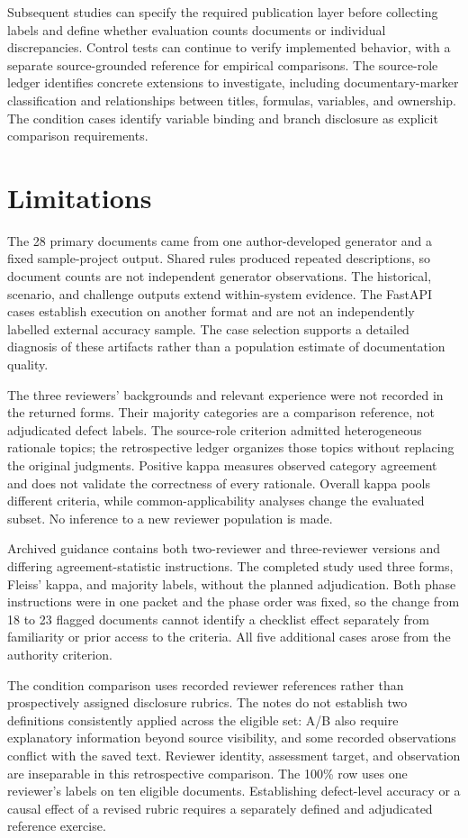 \documentclass[a4paper,fleqn]{cas-dc}
\begin{document}
Subsequent studies can specify the required publication layer before collecting labels and define whether evaluation counts documents or individual discrepancies. Control tests can continue to verify implemented behavior, with a separate source-grounded reference for empirical comparisons. The source-role ledger identifies concrete extensions to investigate, including documentary-marker classification and relationships between titles, formulas, variables, and ownership. The condition cases identify variable binding and branch disclosure as explicit comparison requirements.

\section{Limitations}
\label{sec:limitations}
The 28 primary documents came from one author-developed generator and a fixed sample-project output. Shared rules produced repeated descriptions, so document counts are not independent generator observations. The historical, scenario, and challenge outputs extend within-system evidence. The FastAPI cases establish execution on another format and are not an independently labelled external accuracy sample. The case selection supports a detailed diagnosis of these artifacts rather than a population estimate of documentation quality.

The three reviewers' backgrounds and relevant experience were not recorded in the returned forms. Their majority categories are a comparison reference, not adjudicated defect labels. The source-role criterion admitted heterogeneous rationale topics; the retrospective ledger organizes those topics without replacing the original judgments. Positive kappa measures observed category agreement and does not validate the correctness of every rationale. Overall kappa pools different criteria, while common-applicability analyses change the evaluated subset. No inference to a new reviewer population is made.

Archived guidance contains both two-reviewer and three-reviewer versions and differing agreement-statistic instructions. The completed study used three forms, Fleiss' kappa, and majority labels, without the planned adjudication. Both phase instructions were in one packet and the phase order was fixed, so the change from 18 to 23 flagged documents cannot identify a checklist effect separately from familiarity or prior access to the criteria. All five additional cases arose from the authority criterion.

The condition comparison uses recorded reviewer references rather than prospectively assigned disclosure rubrics. The notes do not establish two definitions consistently applied across the eligible set: A/B also require explanatory information beyond source visibility, and some recorded observations conflict with the saved text. Reviewer identity, assessment target, and observation are inseparable in this retrospective comparison. The 100\% row uses one reviewer's labels on ten eligible documents. Establishing defect-level accuracy or a causal effect of a revised rubric requires a separately defined and adjudicated reference exercise.
\end{document}
